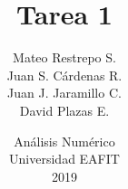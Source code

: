 \documentclass[11pt,letterpaper]{article}%
\title{\vspace{-1cm}Tarea 1}
\author{Mateo Restrepo S.\\Juan S. Cárdenas R.\\Juan J. Jaramillo C.\\David Plazas E.}
\date{\vspace{-0.5cm}Análisis Numérico\\Universidad EAFIT\\2019}
\begin{document}
%


\nocite{*}
\begin{center}

\end{center}

\end{document}
